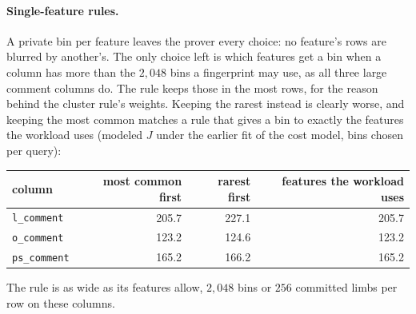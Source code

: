 \paragraph{Single-feature rules.}
\label{sec:fp-single}
A private bin per feature leaves the prover every choice: no feature's
rows are blurred by another's. The only choice left is which features
get a bin when a column has more than the $2{,}048$ bins a fingerprint
may use, as all three large comment columns do. The rule keeps those in
the most rows, for the reason behind the cluster rule's weights. Keeping
the rarest instead is clearly worse, and keeping the most common matches
a rule that gives a bin to exactly the features the workload uses
(modeled $J$ under the earlier fit of the cost model, bins chosen per
query):
\begin{center}
\begin{tabular}{lrrr}
  column & most common first & rarest first & features the workload uses \\
  \hline
  \texttt{l\_comment}  & 205.7 & 227.1 & 205.7 \\
  \texttt{o\_comment}  & 123.2 & 124.6 & 123.2 \\
  \texttt{ps\_comment} & 165.2 & 166.2 & 165.2
\end{tabular}
\end{center}
The rule is as wide as its features allow, $2{,}048$ bins or $256$
committed limbs per row on these columns.

